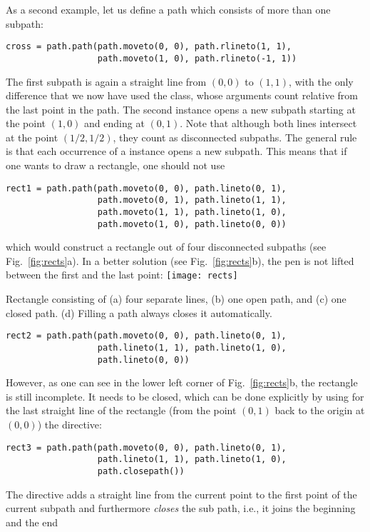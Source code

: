 As a second example, let us define a path which consists of more than 
one subpath:
\begin{verbatim}
cross = path.path(path.moveto(0, 0), path.rlineto(1, 1),
                  path.moveto(1, 0), path.rlineto(-1, 1))
\end{verbatim}
The first subpath is again a straight line from $(0, 0)$ to $(1, 1)$,
with the only difference that we now have used the 
class, whose arguments count relative from the last point in the path.
The second  instance opens a new subpath starting at the
point $(1, 0)$ and ending at $(0, 1)$. Note that although both lines
intersect at the point $(1/2, 1/2)$, they count as disconnected
subpaths.  The general rule is that each occurrence of a 
instance opens a new subpath. This means that if one wants to draw a
rectangle, one should not use
\begin{verbatim}
rect1 = path.path(path.moveto(0, 0), path.lineto(0, 1),
                  path.moveto(0, 1), path.lineto(1, 1),
                  path.moveto(1, 1), path.lineto(1, 0),
                  path.moveto(1, 0), path.lineto(0, 0))
\end{verbatim}
which would construct a rectangle out of four disconnected
subpaths (see Fig.~\ref{fig:rects}a). In a better solution (see
Fig.~\ref{fig:rects}b), the pen is not lifted between the first and
the last point:
%
\texttt{[image: rects]}
\centerline{Rectangle consisting of (a) four separate lines, (b) one open
  path, and (c) one closed path. (d) Filling a
  path always closes it automatically.}
%
\begin{verbatim}
rect2 = path.path(path.moveto(0, 0), path.lineto(0, 1), 
                  path.lineto(1, 1), path.lineto(1, 0),
                  path.lineto(0, 0))
\end{verbatim}
However, as one can see in the lower left corner of
Fig.~\ref{fig:rects}b, the rectangle is still incomplete.  It needs to
be closed, which can  be done explicitly by using for the last straight
line of the rectangle (from the point $(0, 1)$ back to the origin at $(0, 0)$)
the  directive:
\begin{verbatim}
rect3 = path.path(path.moveto(0, 0), path.lineto(0, 1), 
                  path.lineto(1, 1), path.lineto(1, 0),
                  path.closepath())
\end{verbatim}
The  directive adds a straight line from the current
point to the first point of the current subpath and furthermore
\textit{closes} the sub path, i.e., it joins the beginning and the end
